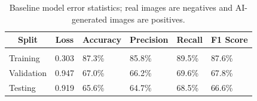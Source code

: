 \documentclass{article} %
\begin{document}
\begin{table}[t]
    \caption{Baseline model error statistics; real images are negatives and AI-generated images are positives.}
    \label{baseline_stats}
    \begin{center}
        \begin{tabular}{llllll}
            \multicolumn{1}{c}{\bf Split} & \multicolumn{1}{c}{\bf Loss} & \multicolumn{1}{c}{\bf Accuracy} & \multicolumn{1}{c}{\bf Precision} & \multicolumn{1}{c}{\bf Recall} & \multicolumn{1}{c}{\bf F1 Score}
            \\ \hline \\
            Training                      & 0.303                        & 87.3\%                           & 85.8\%                            & 89.5\%                         & 87.6\%                           \\
            Validation                    & 0.947                        & 67.0\%                           & 66.2\%                            & 69.6\%                         & 67.8\%                           \\
            Testing                       & 0.919                        & 65.6\%                           & 64.7\%                            & 68.5\%                         & 66.6\%                           \\
        \end{tabular}
    \end{center}
\end{table}
\end{document}
